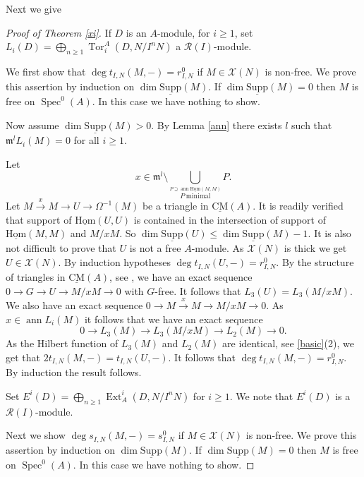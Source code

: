 \documentclass{amsart}
\newcommand{\m}{\mathfrak{m} }
\newcommand{\R}{\mathcal{R} }
\newcommand{\X}{\mathcal{X} }
\newcommand{\rt}{\rightarrow}
\newcommand{\Om}{\Omega}
\newcommand{\Tor}{\operatorname{Tor}}
\newcommand{\ann}{\operatorname{ann}}
\newcommand{\Supp}{\operatorname{\underline{Supp}}}
\newcommand{\Spec}{\operatorname{Spec}}
\newcommand{\CMS}{\operatorname{\underline{CM}}}
\newcommand{\sHom}{\operatorname{\underline{Hom}}}
\newcommand{\Ext}{\operatorname{Ext}}
\theoremstyle{plain}
\theoremstyle{definition}
\theoremstyle{remark}
\begin{document}
Next we give
\begin{proof}[Proof of Theorem \ref{xi}]
If $D$ is an $A$-module,
for $i \geq 1$, set \\ $L_i(D) = \bigoplus_{n \geq 1}\Tor^A_i(D, N/I^{n}N)$ a $\R(I)$-module.

We first show that  $\deg t_{I, N}(M,-) = r_{I, N}^0$ if $M \in \X(N)$ is non-free.
We prove this assertion by induction on $\dim \Supp(M)$. If $\dim \Supp(M) = 0$ then $M$ is free on $\Spec^0(A)$. In this case we have nothing to show.

Now assume $\dim \Supp(M) > 0$.
By Lemma \ref{ann} there exists $l$ such that \\ $\m^l L_i(M) = 0$ for all $i \geq 1$.

Let
$$x \in \m^l \setminus \bigcup_{ \stackrel{P \supseteq \ann \sHom(M, M)}{P \ \text{minimal}}} P.$$
Let $M \xrightarrow{x} M \rt U \rt \Om^{-1}(M)$ be a triangle in $\CMS(A)$. It is readily verified that support of  $\sHom(U, U)$ is contained in the intersection of support of $\sHom(M,M)$ and $M/x M$. So $\dim \Supp(U) \leq \dim \Supp(M) -1$. It is also not difficult to prove that $U$ is not a free $A$-module. As $\X(N)$ is thick we get $U \in \X(N)$. By induction hypotheses  $\deg t_{I, N}(U,-) = r_{I, N}^0$. By the structure of triangles in $\CMS(A)$, see \cite[4.4.1]{Buchw}, we have an exact sequence
$0 \rt G \rt U \rt M/xM \rt 0$ with $G$-free. It follows that $L_3(U) = L_3(M/xM)$. We also have an exact sequence
$0 \rt M \xrightarrow{x} M \rt M/xM \rt 0$. As $x \in \ann L_i(M)$ it follows that we have an exact sequence
$$ 0 \rt L_3(M) \rt L_3(M/xM) \rt L_2(M) \rt 0.$$
As the Hilbert function of $L_3(M)$ and $L_2(M)$ are identical, see  \ref{basic}(2), we get that
$2 t_{I, N}(M, -) = t_{I, N}(U,-)$. It follows that $\deg t_{I, N}(M,-) = r_{I, N}^0$. By induction the result follows.

Set $E^i(D) = \bigoplus_{n \geq 1}\Ext_A^i(D, N/I^{n}N)$ for $i \geq 1$. We note that $E^ i(D)$ is a $\R(I)$-module.

Next we show $\deg s_{I,N}(M, -) = s_{I, N}^0$ if $M \in \X(N)$ is non-free.
We prove this assertion by induction on $\dim \Supp(M)$. If $\dim \Supp(M) = 0$ then $M$ is free on $\Spec^0(A)$. In this case we have nothing to show.


\end{proof}
\end{document}
